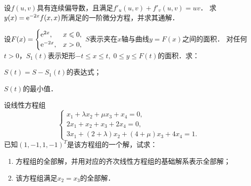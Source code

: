 \documentclass[plain,noanswer,medmath]{../../template/jnuexam}
\begin{document}














\begin{problem}[points=8]
设$f(u,v)$具有连续偏导数，且满足$f'_u(u,v) + f'_v(u,v) = uv$．
求$y(x) = \mathrm{e}^{- 2x} f(x,x)$所满足的一阶微分方程，并求其通解．
\end{problem}




\begin{problem}[points=9]
设$F(x) = \begin{cases}
    \mathrm{e}^{2x}, & x \leqslant 0, \\
  \mathrm{e}^{- 2x}, & x > 0,
\end{cases}$ $S$表示夹在$x$轴与曲线$y = F(x)$之间的面积．
对任何$t > 0$，$S_1(t)$表示矩形$- t \le x \le t,\;0 \le y \le F(t)$的面积．求：\par
\begin{enumerate*}
\item $S(t) = S - S_1(t)$的表达式；
\item $S(t)$的最小值．
\end{enumerate*}
\end{problem}


\begin{problem}[points=13]
设线性方程组
$$\begin{cases}
  x_1 + \lambda x_2 + \mu x_3 + x_4 = 0, \\
  2x_1 + x_2 + x_3 + 2x_4 = 0, \\
  3x_1 + (2 + \lambda)x_2 + (4 + \mu)x_3 + 4x_4 = 1.
\end{cases}$$
已知$(1, - 1,1, - 1)^T$是该方程组的一个解，试求：
\begin{enumerate}
\item 方程组的全部解，并用对应的齐次线性方程组的基础解系表示全部解；
\item 该方程组满足$x_2 = x_3$的全部解．
\end{enumerate}
\end{problem}
\end{document}
